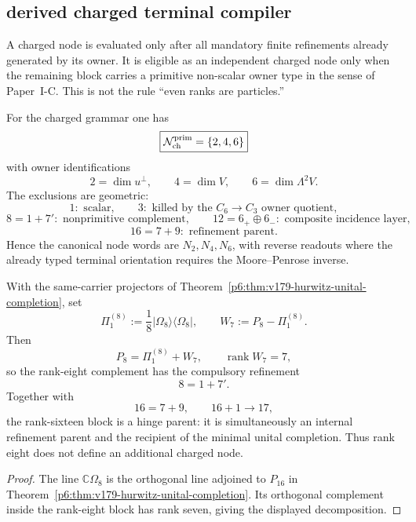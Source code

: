 \documentclass[12pt,a4paper]{article}
\begin{document}

\subsection{derived charged terminal compiler}
\label{p6:sec:v566-derived-charged-terminal-compiler}

\begin{definition}
\label{p6:def:v566-primitive-charged-node}
A charged node is evaluated only after all mandatory finite refinements
already generated by its owner.  It is eligible as an independent charged
node only when the remaining block carries a primitive non-scalar owner type
in the sense of Paper~I-C.  This is not the rule ``even ranks are particles.''
\end{definition}

\begin{theorem}
\label{p6:thm:v566-primitive-charged-node-set}
For the charged grammar one has
\[
 \boxed{\mathcal N_{\rm ch}^{\rm prim}=\{2,4,6\}}
\]
with owner identifications
\[
 \boxed{2=\dim u^\perp,\qquad4=\dim V,\qquad6=\dim\Lambda^2V.}
\]
The exclusions are geometric:
\[
 1:\text{ scalar},\qquad
 3:\text{ killed by the }C_6\to C_3\text{ owner quotient},
\]
\[
 8=1+7':\text{ nonprimitive complement},\qquad
 12=6_+\oplus6_-:\text{ composite incidence layer},
\]
\[
 16=7+9:\text{ refinement parent}.
\]
Hence the canonical node words are \(N_2,N_4,N_6\), with reverse readouts
where the already typed terminal orientation requires the Moore--Penrose
inverse.
\end{theorem}

\begin{proposition}
\label{p6:prop:v566-heavy-hinge-refinement}
With the same-carrier projectors of
Theorem~\ref{p6:thm:v179-hurwitz-unital-completion}, set
\[
 \Pi_1^{(8)}:=\frac18|\Omega_8\rangle\langle\Omega_8|,
 \qquad W_7:=P_8-\Pi_1^{(8)}.
\]
Then
\[
 P_8=\Pi_1^{(8)}+W_7,\qquad \operatorname{rank}W_7=7,
\]
so the rank-eight complement has the compulsory refinement
\[
 \boxed{8=1+7'}.
\]
Together with
\[
 \boxed{16=7+9},\qquad \boxed{16+1\to17},
\]
the rank-sixteen block is a hinge parent: it is simultaneously an internal
refinement parent and the recipient of the minimal unital completion.  Thus
rank eight does not define an additional charged node.
\end{proposition}
\begin{proof}
The line \(\mathbb C\Omega_8\) is the orthogonal line adjoined to
\(P_{16}\) in Theorem~\ref{p6:thm:v179-hurwitz-unital-completion}.  Its
orthogonal complement inside the rank-eight block has rank seven, giving the
displayed decomposition.
\end{proof}
\end{document}
